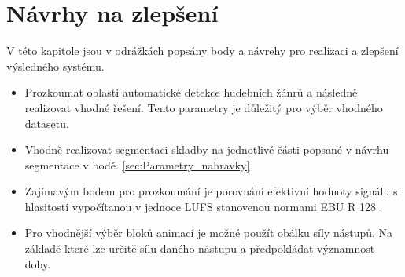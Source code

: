 \section{Návrhy na zlepšení}
V této kapitole jsou v odrážkách popsány body a návrehy pro realizaci a zlepšení výsledného systému. 

\begin{itemize}
    \item Prozkoumat oblasti automatické detekce hudebních žánrů a následně realizovat vhodné řešení. Tento parametry je důležitý pro výběr vhodného datasetu. 
    \item Vhodně realizovat segmentaci skladby na jednotlivé části popsané v návrhu segmentace v bodě. \ref{sec:Parametry_nahravky}
    \item Zajímavým bodem pro prozkoumání je porovnání efektivní hodnoty signálu s hlasitostí vypočítanou v jednoce LUFS stanovenou normami EBU R 128 \cite{EBU_R_128}. 
    \item Pro vhodnější výběr bloků animací je možné použít obálku síly nástupů. Na základě které lze určitě sílu daného nástupu a předpokládat významnost doby.
\end{itemize}


